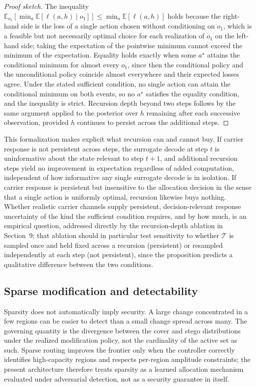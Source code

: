 \documentclass[11pt]{article}
\begin{document}
\begin{proof}[Proof sketch]
The inequality $\mathbb{E}_{o_1}[\min_a \mathbb{E}[\ell(a,h)\mid o_1]] \le \min_a \mathbb{E}[\ell(a,h)]$ holds because the right-hand side is the loss of a single action chosen without conditioning on $o_1$, which is a feasible but not necessarily optimal choice for each realization of $o_1$ on the left-hand side; taking the expectation of the pointwise minimum cannot exceed the minimum of the expectation. Equality holds exactly when some $a^\star$ attains the conditional minimum for almost every $o_1$, since then the conditional policy and the unconditional policy coincide almost everywhere and their expected losses agree. Under the stated sufficient condition, no single action can attain the conditional minimum on both events, so no $a^\star$ satisfies the equality condition, and the inequality is strict. Recursion depth beyond two steps follows by the same argument applied to the posterior over $h$ remaining after each successive observation, provided $h$ continues to persist across the additional steps.
\end{proof}

This formalization makes explicit what recursion can and cannot buy. If carrier response is not persistent across steps, the surrogate decode at step $t$ is uninformative about the state relevant to step $t+1$, and additional recursion steps yield no improvement in expectation regardless of added computation, independent of how informative any single surrogate decode is in isolation. If carrier response is persistent but insensitive to the allocation decision in the sense that a single action is uniformly optimal, recursion likewise buys nothing. Whether realistic carrier channels supply persistent, decision-relevant response uncertainty of the kind the sufficient condition requires, and by how much, is an empirical question, addressed directly by the recursion-depth ablation in Section~9; that ablation should in particular test sensitivity to whether $\mathcal{T}$ is sampled once and held fixed across a recursion (persistent) or resampled independently at each step (not persistent), since the proposition predicts a qualitative difference between the two conditions.

\subsection{Sparse modification and detectability}

Sparsity does not automatically imply security. A large change concentrated in a few regions can be easier to detect than a small change spread across many. The governing quantity is the divergence between the cover and stego distributions under the realized modification policy, not the cardinality of the active set as such. Sparse routing improves the frontier only when the controller correctly identifies high-capacity regions and respects per-region amplitude constraints; the present architecture therefore treats sparsity as a learned allocation mechanism evaluated under adversarial detection, not as a security guarantee in itself.
\end{document}
